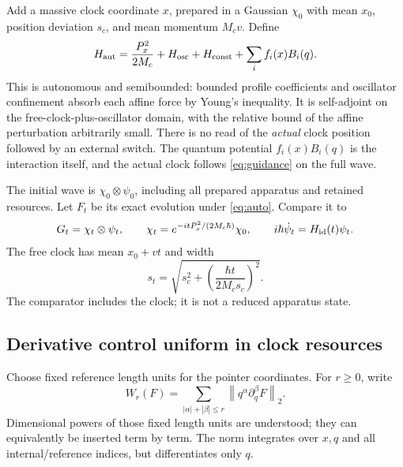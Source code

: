 \documentclass[11pt]{article}
\theoremstyle{definition}\newtheorem{assumption}[theorem]{Constitutive assumption}
\theoremstyle{remark}\newtheorem{remark}[theorem]{Remark}
\newcommand{\norm}[1]{\left\|#1\right\|}\newcommand{\pos}[1]{[#1]_+}
\begin{document}
Add a massive clock coordinate $x$, prepared in a Gaussian $\chi_0$ with mean $x_0$, position deviation $s_c$, and mean momentum $M_cv$. Define
\begin{equation}\label{eq:auto}
 H_{\rm aut}=\frac{P_x^2}{2M_c}+H_{\rm osc}+H_{\rm const}+
                              \sum_i f_i(x)B_i(q).
\end{equation}
This is autonomous and semibounded: bounded profile coefficients and oscillator confinement absorb each affine force by Young's inequality. It is self-adjoint on the free-clock-plus-oscillator domain, with the relative bound of the affine perturbation arbitrarily small. There is no read of the \emph{actual} clock position followed by an external switch. The quantum potential $f_i(x)B_i(q)$ is the interaction itself, and the actual clock follows \eqref{eq:guidance} on the full wave.

The initial wave is $\chi_0\otimes\psi_0$, including all prepared apparatus and retained resources. Let $F_t$ be its exact evolution under \eqref{eq:auto}. Compare it to
\[
 G_t=\chi_t\otimes\psi_t,\qquad
 \chi_t=e^{-itP_x^2/(2M_c\hbar)}\chi_0,\qquad
 i\hbar\dot\psi_t=H_{\rm id}(t)\psi_t.
\]
The free clock has mean $x_0+vt$ and width
\begin{equation}\label{eq:clockwidth}
 s_t=\sqrt{s_c^2+\left(\frac{\hbar t}{2M_cs_c}\right)^2}.
\end{equation}
The comparator includes the clock; it is not a reduced apparatus state.

\subsection{Derivative control uniform in clock resources}
Choose fixed reference length units for the pointer coordinates. For $r\ge0$, write
\[
 W_r(F)=\sum_{|\alpha|+|\beta|\le r}\norm{q^\alpha\partial_q^\beta F}_2.
\]
Dimensional powers of those fixed length units are understood; they can equivalently be inserted term by term. The norm integrates over $x,q$ and all internal/reference indices, but differentiates only $q$.
\end{document}

